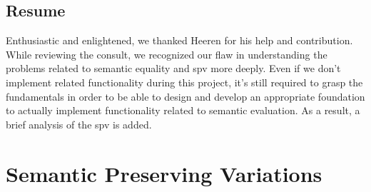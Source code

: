 \subsection{Resume}
Enthusiastic and enlightened, we thanked Heeren for his help and contribution.
While reviewing the consult, we recognized our flaw in understanding the 
problems related to semantic equality and \gls{spv} more deeply. Even if we 
don't implement related functionality during this project, it's still required
to grasp the fundamentals in order to be able to design and develop an 
appropriate foundation to actually implement functionality related to semantic
evaluation. As a result, a brief analysis of the \gls{spv} is added. 

\section{Semantic Preserving Variations}








